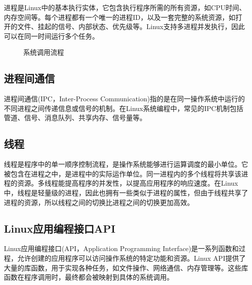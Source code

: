\documentclass[12pt, a4paper, oneside]{ctexbook}
\numberwithin{figure}{section}
\begin{document}
进程是Linux中的基本执行实体，它包含执行程序所需的所有资源，如CPU时间、内存空间等。每个进程都有一个唯一的进程ID，以及一套完整的系统资源，如打开的文件、挂起的信号、内部状态、优先级等。Linux支持多进程并发执行，因此可以在同一时间运行多个任务。
\begin{figure}[H]
\centering
 \caption{系统调用流程}
 \label{}
\end{figure}
\subsection{进程间通信}
    
进程间通信(IPC，Inter-Process Communication)指的是在同一操作系统中运行的不同进程之间传递信息或信号的机制。在Linux系统编程中，常见的IPC机制包括管道、信号、消息队列、共享内存、信号量等。
    
\subsection{线程}
    
线程是程序中的单一顺序控制流程，是操作系统能够进行运算调度的最小单位。它被包含在进程之中，是进程中的实际运作单位。同一进程内的多个线程将共享该进程的资源。多线程能提高程序的并发性，以提高应用程序的响应速度。在Linux中，线程是轻量级的进程，因此也拥有一些类似于进程的属性，但由于线程共享了进程的资源，所以线程之间的切换比进程之间的切换更加高效。

\subsection{Linux应用编程接口API}

Linux应用编程接口(API，Application Programming Interface)是一系列函数和过程，允许创建的应用程序可以访问操作系统的特定功能和资源。Linux API提供了大量的库函数，用于实现各种任务，如文件操作、网络通信、内存管理等。这些库函数在程序调用时，最终都会被映射到具体的系统调用。
    
\end{document}
